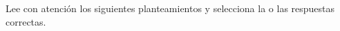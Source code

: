 Lee con atención los siguientes planteamientos y selecciona la o las respuestas correctas.

\begin{multicols}{2}
    \begin{parts}
        
        
        
        
        \columnbreak
        
        
        
    \end{parts}
\end{multicols}